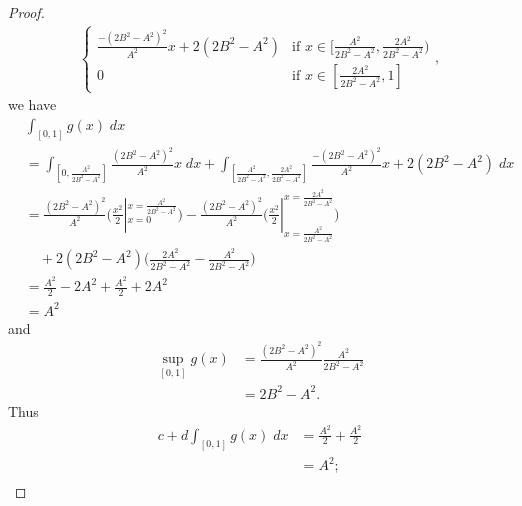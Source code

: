\begin{proof}
\begin{align*}
\begin{cases}
                                            \frac{-(2 B^2 - A^2)^2}{A^2} x + 2 (2 B^2 - A^2) & \text{if } x \in [\frac{A^2}{2 B^2 - A^2}, \frac{2 A^2}{2 B^2 - A^2}) \\
                                            0                                                & \text{if } x \in [\frac{2 A^2}{2 B^2 - A^2}, 1]
                                        \end{cases},
    \end{align*}
    we have
    \begin{align*}
         & \int_{[0, 1]} g(x) \; dx                                                                                                                                                                                              \\
         & = \int_{[0, \frac{A^2}{2 B^2 - A^2}]} \frac{(2 B^2 - A^2)^2}{A^2} x \; dx + \int_{[\frac{A^2}{2 B^2 - A^2}, \frac{2 A^2}{2 B^2 - A^2}]} \frac{-(2 B^2 - A^2)^2}{A^2} x + 2 (2 B^2 - A^2) \; dx                        \\
         & = \frac{(2 B^2 - A^2)^2}{A^2} \bigg(\frac{x^2}{2}|_{x = 0}^{x = \frac{A^2}{2 B^2 - A^2}}\bigg) - \frac{(2 B^2 - A^2)^2}{A^2} \bigg(\frac{x^2}{2}|_{x = \frac{A^2}{2 B^2 - A^2}}^{x = \frac{2 A^2}{2 B^2 - A^2}}\bigg) \\
         & \quad + 2 (2 B^2 - A^2) \bigg(\frac{2 A^2}{2 B^2 - A^2} - \frac{A^2}{2 B^2 - A^2}\bigg)                                                                                                                               \\
         & = \frac{A^2}{2} - 2 A^2 + \frac{A^2}{2} + 2 A^2                                                                                                                                                                       \\
         & = A^2
    \end{align*}
    and
    \begin{align*}
        \sup_{[0, 1]} g(x) & = \frac{(2 B^2 - A^2)^2}{A^2} \frac{A^2}{2 B^2 - A^2} \\
                           & = 2 B^2 - A^2.
    \end{align*}
    Thus
    \begin{align*}
        c + d \int_{[0, 1]} g(x) \; dx           & = \frac{A^2}{2} + \frac{A^2}{2}         \\
                                                 & = A^2;                                  \\

\end{align*}
\end{proof}
